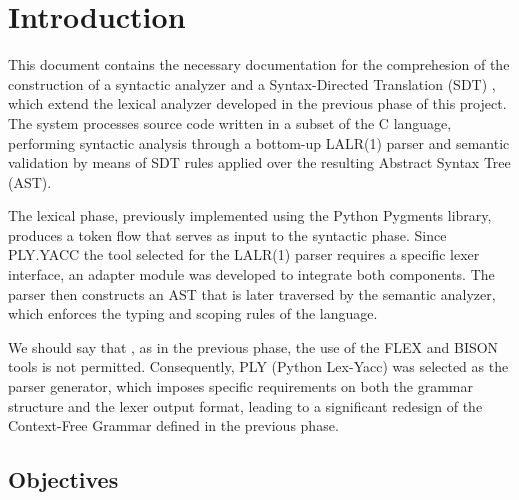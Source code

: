 \documentclass[letterpaper,12pt,oneside]{article}
\begin{document}
\raggedbottom

 
\tableofcontents
\clearpage
    

\section{Introduction} %


This document contains the necessary documentation for the comprehesion of  the construction of a syntactic analyzer and a Syntax-Directed Translation (SDT) , which extend the lexical analyzer developed in the previous phase of this project. The system processes source code written in a subset of the C language, performing syntactic analysis through a bottom-up LALR(1) parser and semantic validation by means of SDT rules applied over the resulting Abstract Syntax Tree (AST).

The lexical phase, previously implemented using the Python Pygments library, produces a token flow that serves as input to the syntactic phase. Since PLY.YACC  the tool selected for the LALR(1) parser  requires a specific lexer interface, an adapter module was developed to integrate both components. The parser then constructs an AST that is later traversed by the semantic analyzer, which enforces the typing and scoping rules of the language.

We should say that , as in the previous phase, the use of the FLEX and BISON tools is not permitted. Consequently, PLY (Python Lex-Yacc) was selected as the parser generator, which imposes specific requirements on both the grammar structure and the lexer output format, leading to a significant redesign of the Context-Free Grammar defined in the previous phase.




\subsection*{Objectives}
\end{document}
